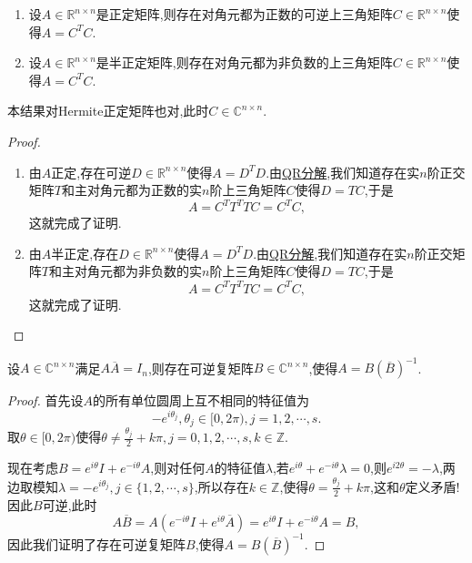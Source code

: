 \documentclass[../../main.tex]{subfiles}
\begin{document}
\begin{theorem}[正定矩阵分解为上三角]\label{theorem:正定矩阵分解为上三角}
\begin{enumerate}
\item 设\( A \in \mathbb{R}^{n \times n} \)是正定矩阵,则存在对角元都为正数的可逆上三角矩阵\( C \in \mathbb{R}^{n \times n} \)使得\( A = C^T C \).

\item 设\( A \in \mathbb{R}^{n \times n} \)是半正定矩阵,则存在对角元都为非负数的上三角矩阵\( C \in \mathbb{R}^{n \times n} \)使得\( A = C^T C \).
\end{enumerate}
\end{theorem}
\begin{note}
本结果对Hermite正定矩阵也对,此时\( C \in \mathbb{C}^{n \times n} \).
\end{note}
\begin{proof}
\begin{enumerate}
\item 由\( A \)正定,存在可逆\( D \in \mathbb{R}^{n \times n} \)使得\( A = D^T D \).由\hyperref[theorem:施密特正交化对应的矩阵分解,QR分解]{QR分解},我们知道存在实\( n \)阶正交矩阵\( T \)和主对角元都为正数的实\( n \)阶上三角矩阵\( C \)使得\( D = TC \),于是
\[
A = C^T T^T T C = C^T C,
\]
这就完成了证明.

\item 由\( A \)半正定,存在\( D \in \mathbb{R}^{n \times n} \)使得\( A = D^T D \).由\hyperref[theorem:施密特正交化对应的矩阵分解,QR分解]{QR分解},我们知道存在实\( n \)阶正交矩阵\( T \)和主对角元都为非负数的实\( n \)阶上三角矩阵\( C \)使得\( D = TC \),于是
\[
A = C^T T^T T C = C^T C,
\]
这就完成了证明.
\end{enumerate}
\end{proof}

\begin{theorem}\label{theorem:定理1354846135}
设\( A \in \mathbb{C}^{n \times n} \)满足\( A \overline{A} = I_n \),则存在可逆复矩阵\( B \in \mathbb{C}^{n \times n} \),使得\( A = B (\overline{B})^{-1} \).
\end{theorem}
\begin{proof}
首先设\( A \)的所有单位圆周上互不相同的特征值为
\[
-e^{i\theta_j}, \theta_j \in [0, 2\pi), j = 1, 2, \cdots, s.
\]
取\( \theta \in [0, 2\pi) \)使得\( \theta \neq \frac{\theta_j}{2} + k\pi, j = 0, 1, 2, \cdots, s, k \in \mathbb{Z} \).

现在考虑\( B = e^{i\theta} I + e^{-i\theta} A \),则对任何\( A \)的特征值\( \lambda \),若\( e^{i\theta} + e^{-i\theta} \lambda = 0 \),则\( e^{i2\theta} = -\lambda \),两边取模知\( \lambda = -e^{i\theta_j}, j \in \{1, 2, \cdots, s\} \),所以存在\( k \in \mathbb{Z} \),使得\( \theta = \frac{\theta_j}{2} + k\pi \),这和\( \theta \)定义矛盾!因此\( B \)可逆,此时
\[
A \overline{B} = A \left( e^{-i\theta} I + e^{i\theta} \overline{A} \right) = e^{i\theta} I + e^{-i\theta} A = B,
\]
因此我们证明了存在可逆复矩阵\( B \),使得\( A = B (\overline{B})^{-1} \).
\end{proof}
\end{document}
